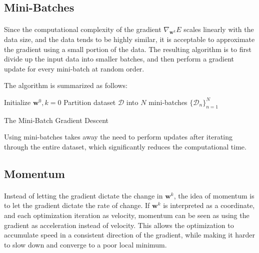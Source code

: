 \subsection{Mini-Batches} \label{subsc:mini_batches}

\paragraph{}
Since the computational complexity of the gradient 
$\nabla_{\mathbf{w}^k}E$ scales linearly with the data size,
and the data tends to be highly similar, 
it is acceptable to approximate the gradient using 
a small portion of the data.
The resulting algorithm is to first divide up 
the input data into smaller batches, 
and then perform a gradient update for every mini-batch 
at random order.

The algorithm is summarized as follows:

\begin{algorithm}[H]
 Initialize $\mathbf{w}^0, k=0$\;
 {Partition} dataset $\mathcal{D}$ into $N$
    mini-batches $\{\mathcal{D}_n\}_{n=1}^N$ \;
 \caption{The Mini-Batch Gradient Descent}
\end{algorithm}

Using mini-batches takes away the need to perform updates 
after iterating through the entire dataset, 
which significantly reduces the computational time.





\subsection{Momentum} \label{subsc:momemtum}

\paragraph{}
Instead of letting the gradient dictate the change in $\mathbf{w}^k$,
the idea of momentum is to let the gradient dictate the rate of change.
If $\mathbf{w}^k$ is interpreted as a coordinate,
and each optimization iteration as velocity,
momentum can be seen as using the gradient as acceleration
instead of velocity. 
This allows the optimization to accumulate speed in 
a consistent direction of the gradient, 
while making it harder to slow down and 
converge to a poor local minimum.

